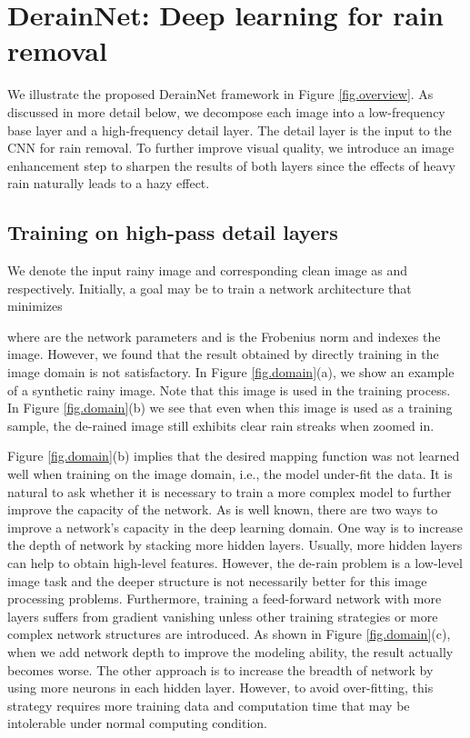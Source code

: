 \documentclass[journal]{IEEEtran}
\begin{document}
\section{DerainNet: Deep learning for rain removal}
We illustrate the proposed DerainNet framework in Figure \ref{fig.overview}. As discussed in more detail below, we decompose each image into a low-frequency base layer and a high-frequency detail layer. The detail layer is the input to the CNN for rain removal. To further improve visual quality, we introduce an image enhancement step to sharpen the results of both layers since the effects of heavy rain naturally leads to a hazy effect.

\subsection{Training on high-pass detail layers}
\label{sec.Detail_strategy}
We denote the input rainy image and corresponding clean image as   and  respectively. Initially, a goal may be to train a network architecture  that minimizes

where   are the network parameters and  is the Frobenius norm and  indexes the image. However, we found that the result obtained by directly training in the image domain is not satisfactory. In Figure \ref{fig.domain}(a), we show an example of a synthetic rainy image. Note that this image is used in the training process. In Figure \ref{fig.domain}(b) we see that even when this image is used as a training sample, the de-rained image still exhibits clear rain streaks when zoomed in.

Figure \ref{fig.domain}(b) implies that the desired mapping function was not learned well when training on the image domain, i.e., the model under-fit the data. It is natural to ask whether it is necessary to train a more complex model to further improve the capacity of the network. As is well known, there are two ways to improve a network's capacity in the deep learning domain. One way is to increase the depth of network \cite{He2016resnet} by stacking more hidden layers. Usually, more hidden layers can help to obtain high-level features. However, the de-rain problem is a low-level image task and the deeper structure is not necessarily better for this image processing problems. Furthermore, training a feed-forward network with more layers suffers from gradient vanishing unless other training strategies or more complex network structures are introduced. As shown in Figure \ref{fig.domain}(c), when we add network depth to improve the modeling ability, the result actually becomes worse. The other approach is 
to increase the breadth of network  \cite{Schmidhuber} by using more neurons in each hidden layer. However, to avoid over-fitting, this strategy requires more training data and computation time that may be intolerable under normal computing condition.
\end{document}
